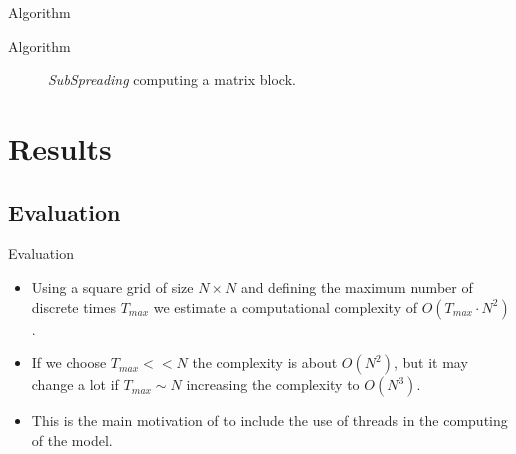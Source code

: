 \documentclass{beamer}
\begin{document}
      \begin{frame}{Algorithm}
        \begin{algorithm}[H]
          \begin{algorithmic}
                \EndFor
              \EndFor
            \EndProcedure
          \end{algorithmic}
          \caption{Sub-spreading Algorithm}
          \label{alg:subspreading}
        \end{algorithm}
      \end{frame}
      
      \begin{frame}{Algorithm}
        \begin{figure}
          \centering
          \resizebox{0.65\textwidth}{!}{
            
          }    
          \caption{\emph{SubSpreading} computing a matrix block.}
          \label{fig:thread}
        \end{figure}
      \end{frame}
      
  \section{Results}
      \subsection{Evaluation}
      
      \begin{frame}{Evaluation}
        \begin{itemize}
          \item<1-> Using a square grid of size $N \times N$ and defining the maximum number
            of discrete times $T_{max}$ we estimate a computational complexity of $O(T_{max}\cdot N^2)$. 
          \item<2-> If we choose $T_{max} << N$ the complexity is about $O(N^2)$, but it 
            may change a lot if $T_{max}\sim N$ increasing the complexity to $O(N^3)$. 
          \item<3-> This is the main  motivation of to include the use of threads in the computing of the model.
        \end{itemize} 
      \end{frame}
      
\end{document}
